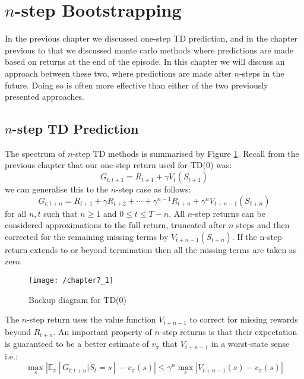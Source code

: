 \section{$n$-step Bootstrapping}
In the previous chapter we discussed one-step TD prediction, and in the chapter previous to that we discussed monte carlo methods where predictions are made based on returns at the end of the episode. In this chapter we will discuss an approach between these two, where predictions are made after $n$-steps in the future. Doing so is often more effective than either of the two previously presented approaches. 

\subsection{$n$-step TD Prediction}
The spectrum of $n$-step TD methods is summarised by Figure \ref{fig: n-step methods}. Recall from the previous chapter that our one-step return used for TD(0) was:
\begin{equation}
	G_{t:t+1} = R_{t+1} + \gamma V_t(S_{t+1})
\end{equation}
we can generalise this to the $n$-step case as follows:
\begin{equation}
	G_{t:t+n} = R_{t+1} + \gamma R_{t+2} + \cdots + \gamma^{n-1}R_{t+n} + \gamma^nV_{t+n-1}(S_{t+n})
\end{equation}
for all $n, t$ such that $n \geq 1$ and $0 \leq t \leq T - n$. All $n$-step returns can be considered approximations to the full return, truncated after $n$ steps and then corrected for the remaining missing terms by $V_{t+n-1}(S_{t+n})$. If the n-step return extends to or beyond termination then all the missing terms are taken as zero.

\begin{figure}[h!]
	\centering
	\texttt{[image: /chapter7\_1]}
	\caption{Backup diagram for TD(0)}
	\label{fig: n-step methods}
\end{figure}\label{key}

The $n$-step return uses the value function $V_{t+n-1}$ to correct for missing rewards beyond $R_{t+n}$. An important property of $n$-step returns is that their expectation is guaranteed to be a better estimate of $v_\pi$ that $V_{t+n-1}$ in a worst-state sense i.e.:
\begin{equation}
\max_{s}|\mathbb{E}_\pi \left[G_{t:t+n} | S_t = s\right] - v_\pi(s)| \leq \gamma^n \max_{s} |V_{t+n-1}(s) - v_\pi(s)|
\end{equation}

